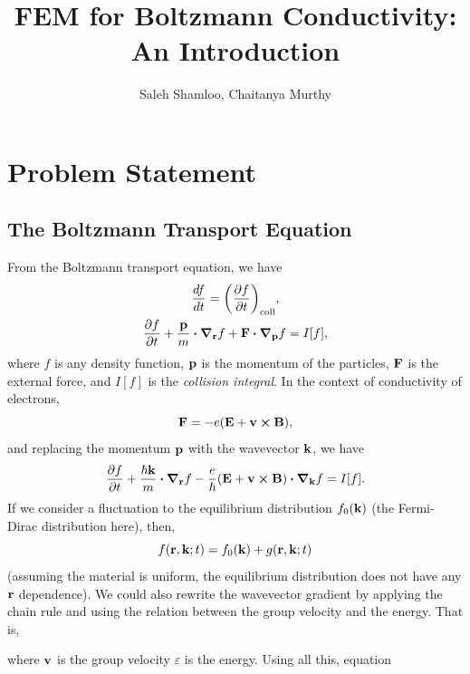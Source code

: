 \documentclass[12pt]{article}
\title{FEM for Boltzmann Conductivity: An Introduction}
\author{Saleh Shamloo, Chaitanya Murthy}
\begin{document}
\maketitle
\section{Problem Statement}
\subsection{The Boltzmann Transport Equation}
From the Boltzmann transport equation, we have
\begin{gather}
    \dv{f}{t} = \qty(\pdv{f}{t})_{\text{coll}}, \\
    \pdv{f}{t} + \frac{\vb{p}}{m}\vdot\grad_{\vb{r}} f + \vb{F}\vdot\grad_{\vb{p}}f = I[f],
\end{gather}
where $f$ is any density function, $\vb{p}$ is the momentum of the particles, $\vb{F}$ is the
external force, and $I[f]$ is the \emph{collision integral}. In the context of conductivity of
electrons,
\begin{equation}
    \vb{F} = -e\qty(\vb{E} + \vb{v}\cross\vb{B}),
\end{equation}
and replacing the momentum $\vb{p}$ with the wavevector $\vb{k}$, we have
\begin{equation}
    \pdv{f}{t} + \frac{\hbar\vb{k}}{m}\vdot\grad_{\vb{r}} f
    - \frac{e}{\hbar}\qty(\vb{E} + \vb{v}\cross\vb{B})\vdot\grad_{\vb{k}}f = I[f].
    \label{eq:boltzmann_general}
\end{equation}
If we consider a fluctuation to the equilibrium distribution $f_0(\vb{k})$ (the Fermi-Dirac
distribution here), then,
\begin{equation}
    f(\vb{r}, \vb{k}; t) = f_0(\vb{k}) + g(\vb{r}, \vb{k}; t)
\end{equation}
(assuming the material is uniform, the equilibrium distribution does not have any $\vb{r}$
dependence). We could also rewrite the wavevector gradient by applying the chain rule and using
the relation between the group velocity and the energy. That is,
where $\vb{v}$ is the group velocity $\varepsilon$ is the energy. Using all this, equation
\end{document}
